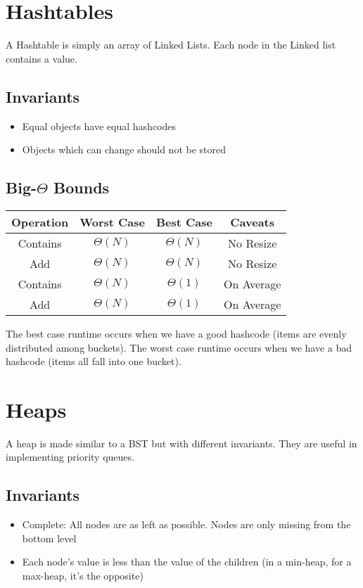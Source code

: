 \documentclass{article}
\begin{document}
\section{Hashtables}
A Hashtable is simply an array of Linked Lists. Each node in the Linked list contains a value.
\subsection{Invariants}
\begin{itemize}
    \item Equal objects have equal hashcodes
    \item Objects which can change should not be stored
\end{itemize}
\subsection{Big-$\Theta$ Bounds}
\begin{center}
    \begin{tabular}{ c | c | c | c }
     Operation & Worst Case & Best Case & Caveats\\
     \hline
     Contains & $\Theta(N)$ & $\Theta(N)$ & No Resize\\ 
     Add & $\Theta(N)$ & $\Theta(N)$ & No Resize \\  
     Contains & $\Theta(N)$ & $\Theta(1)$ & On Average \\
     Add & $\Theta(N)$ & $\Theta(1)$ & On Average
    \end{tabular}
\end{center}
The best case runtime occurs when we have a good hashcode (items are evenly distributed among buckets).
The worst case runtime occurs when we have a bad hashcode (items all fall into one bucket).
\section{Heaps}
A heap is made similar to a BST but with different invariants. They are useful in implementing priority queues.
\subsection{Invariants}
\begin{itemize}
    \item Complete: All nodes are as left as possible. Nodes are only missing from the bottom level
    \item Each node's value is less than the value of the children (in a min-heap, for a max-heap, it's the opposite)
\end{itemize}
\end{document}
